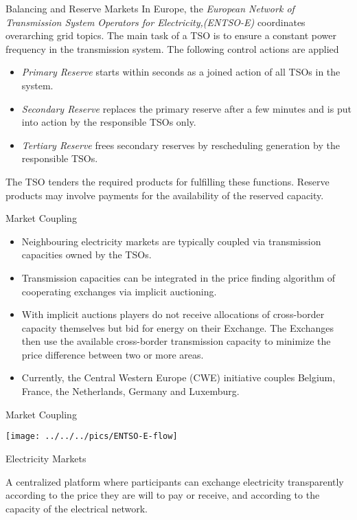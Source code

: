 {Balancing and Reserve Markets}
In Europe, the {\it European Network of Transmission System Operators for Electricity,(ENTSO-E)} coordinates overarching grid topics. The main task of a TSO is to ensure a constant power frequency in the transmission system. The following control actions are applied
\begin{itemize}
\item<1->{\it Primary Reserve}   starts within seconds as a joined action of all TSOs in the system.
\item<2-> {\it Secondary Reserve} replaces the primary reserve after a few minutes and is put into action by the responsible TSOs only.
\item<3->{\it Tertiary Reserve} frees secondary reserves by rescheduling generation by the responsible TSOs.
\end{itemize}
The TSO tenders the required products for fulfilling these functions. Reserve products may involve payments for the availability of the reserved capacity.



{Market Coupling}
\begin{itemize}
\item<1-> Neighbouring electricity markets are typically coupled via transmission capacities owned by the TSOs.
\item<2->  Transmission capacities can be integrated in the price finding algorithm of cooperating exchanges via implicit auctioning.
\item<3-> With implicit auctions  players do not  receive allocations of cross-border capacity themselves but bid for energy on their Exchange. The Exchanges then use the available cross-border transmission capacity to minimize the price difference between two or more areas.
\item<4->  Currently, the Central Western Europe (CWE) initiative couples Belgium, France, the Netherlands, Germany and Luxemburg.
\end{itemize}




{Market Coupling}
\begin{center}
\texttt{[image: ../../../pics/ENTSO-E-flow]}
\end{center}





{Electricity Markets}

A centralized platform where participants can exchange electricity transparently
according to the price they are will to pay or receive, and according to the capacity of
the electrical network.


